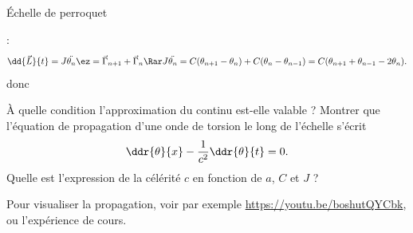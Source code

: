 \begin{exo}[PC][1][exp]{Échelle de perroquet}
\begin{quest}
{ :
$$
\dd{\Vec{L}}{t} = J \ddot{\theta_n} \ez = \Vec{\Gamma}_{n+1} + \Vec{\Gamma}_{n} \Rar J \ddot{\theta_n} = C(\theta_{n+1}-\theta_n)  + C(\theta_{n}-\theta_{n-1}) = C(\theta_{n+1} + \theta_{n-1} - 2 \theta_{n}).
$$
donc
  }
\item À quelle condition l’approximation du continu est-elle valable ?
 Montrer que l'équation de propagation d'une onde de torsion le long de l'échelle s’écrit 
  \begin{equation}
    \ddr{\theta}{x} - \frac{1}{c^2}\ddr{\theta}{t}=0. 
  \end{equation}
 Quelle est l’expression de la célérité $c$ en fonction de $a$, $C$ et $J$ ?
\end{quest}
Pour visualiser la propagation, voir par exemple \url{https://youtu.be/boshutQYCbk}, ou l’expérience de cours.
\end{exo}

